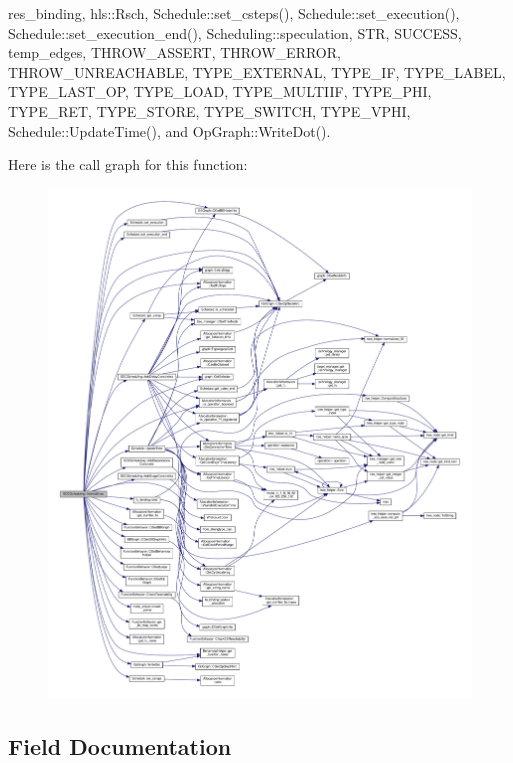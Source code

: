 res\+\_\+binding, hls\+::\+Rsch, Schedule\+::set\+\_\+csteps(), Schedule\+::set\+\_\+execution(), Schedule\+::set\+\_\+execution\+\_\+end(), Scheduling\+::speculation, S\+TR, S\+U\+C\+C\+E\+SS, temp\+\_\+edges, T\+H\+R\+O\+W\+\_\+\+A\+S\+S\+E\+RT, T\+H\+R\+O\+W\+\_\+\+E\+R\+R\+OR, T\+H\+R\+O\+W\+\_\+\+U\+N\+R\+E\+A\+C\+H\+A\+B\+LE, T\+Y\+P\+E\+\_\+\+E\+X\+T\+E\+R\+N\+AL, T\+Y\+P\+E\+\_\+\+IF, T\+Y\+P\+E\+\_\+\+L\+A\+B\+EL, T\+Y\+P\+E\+\_\+\+L\+A\+S\+T\+\_\+\+OP, T\+Y\+P\+E\+\_\+\+L\+O\+AD, T\+Y\+P\+E\+\_\+\+M\+U\+L\+T\+I\+IF, T\+Y\+P\+E\+\_\+\+P\+HI, T\+Y\+P\+E\+\_\+\+R\+ET, T\+Y\+P\+E\+\_\+\+S\+T\+O\+RE, T\+Y\+P\+E\+\_\+\+S\+W\+I\+T\+CH, T\+Y\+P\+E\+\_\+\+V\+P\+HI, Schedule\+::\+Update\+Time(), and Op\+Graph\+::\+Write\+Dot().

Here is the call graph for this function\+:
\nopagebreak
\begin{figure}[H]
\begin{center}
\leavevmode
\includegraphics[width=350pt]{d4/dc5/classSDCScheduling_afd40bf8d626a3ad4f3a6943365933833_cgraph}
\end{center}
\end{figure}


\subsection{Field Documentation}
\mbox{\label{classSDCScheduling_a24d76430568b1aa0a5b27ea46c8ebe47}} 
